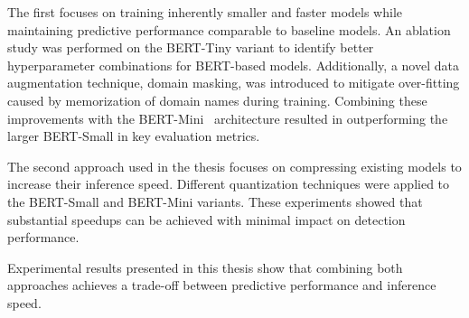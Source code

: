 The first focuses on training inherently smaller and faster models while maintaining predictive performance comparable to baseline models. An ablation study was performed on the BERT-Tiny variant to identify better hyperparameter combinations for BERT-based models. Additionally, a novel data augmentation technique, domain masking, was introduced to mitigate over-fitting caused by memorization of domain names during training. Combining these improvements with the BERT-Mini~\cite{turc2019} architecture resulted in outperforming the larger BERT-Small in key evaluation metrics.

The second approach used in the thesis focuses on compressing existing models to increase their inference speed. Different quantization techniques were applied to the BERT-Small and BERT-Mini variants. These experiments showed that substantial speedups can be achieved with minimal impact on detection performance.

Experimental results presented in this thesis show that combining both approaches achieves a trade-off between predictive performance and inference speed.